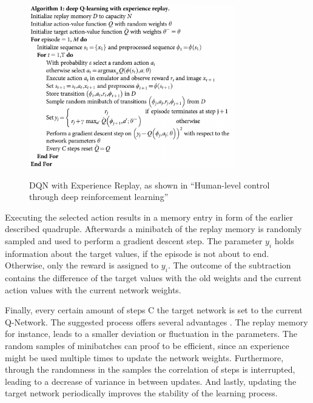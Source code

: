\begin{figure}[hpbt]
    \centering
    \includegraphics[width=0.8\textwidth]{pictures/dqn_algo_code.png}\\
    \caption[DQN with Experience Replay]{DQN with Experience Replay, as shown in ``Human-level control through deep reinforcement learning'' \cite{mnka15}}\label{fig:dqn_algo_code}
\end{figure}

Executing the selected action results in a memory entry in form of the earlier described quadruple. Afterwards a  minibatch of the replay memory is randomly sampled and used to perform a gradient descent step. The parameter $y_i$ holds information about the target values, if the episode is not about to end. Otherwise, only the reward is assigned to $y_i$. The outcome of the subtraction contains the difference of the target values with the old weights and the current action values with the current network weights.

Finally, every certain amount of steps C the target network is set to the current Q-Network. The suggested process offers several advantages \cite{mnka15}. The replay memory for instance, leads to a smaller deviation or fluctuation in the parameters. The random samples of minibatches can proof to be efficient, since an experience might be used multiple times to update the network weights. Furthermore, through the randomness in the samples the correlation of steps is interrupted, leading to a decrease of variance in between updates. And lastly, updating the target network periodically improves the stability of the learning process.